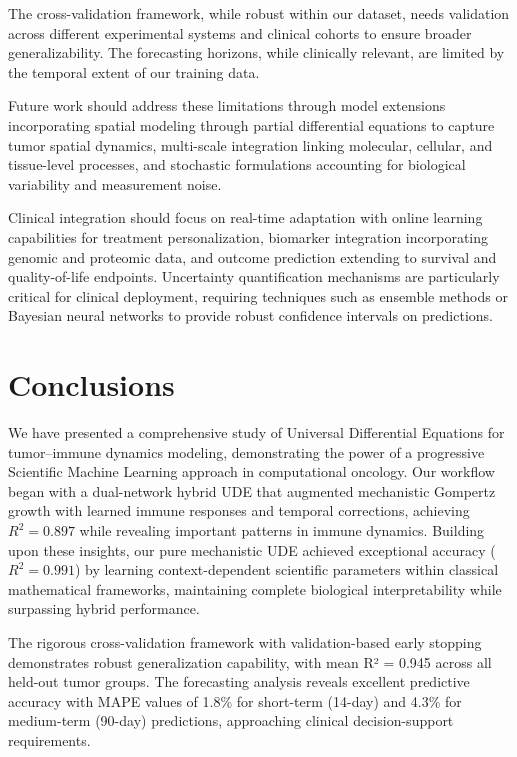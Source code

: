 \documentclass{juliacon}
\begin{document}
The cross-validation framework, while robust within our dataset, needs validation across different experimental systems and clinical cohorts to ensure broader generalizability. The forecasting horizons, while clinically relevant, are limited by the temporal extent of our training data.

Future work should address these limitations through model extensions incorporating spatial modeling through partial differential equations to capture tumor spatial dynamics, multi-scale integration linking molecular, cellular, and tissue-level processes, and stochastic formulations accounting for biological variability and measurement noise.

Clinical integration should focus on real-time adaptation with online learning capabilities for treatment personalization, biomarker integration incorporating genomic and proteomic data, and outcome prediction extending to survival and quality-of-life endpoints. Uncertainty quantification mechanisms are particularly critical for clinical deployment, requiring techniques such as ensemble methods or Bayesian neural networks to provide robust confidence intervals on predictions.

\section{Conclusions}

We have presented a comprehensive study of Universal Differential Equations for tumor--immune dynamics modeling, demonstrating the power of a progressive Scientific Machine Learning approach in computational oncology. Our workflow began with a dual-network hybrid UDE that augmented mechanistic Gompertz growth with learned immune responses and temporal corrections, achieving $R^2 = 0.897$ while revealing important patterns in immune dynamics. Building upon these insights, our pure mechanistic UDE achieved exceptional accuracy ($R^2 = 0.991$) by learning context-dependent scientific parameters within classical mathematical frameworks, maintaining complete biological interpretability while surpassing hybrid performance.

The rigorous cross-validation framework with validation-based early stopping demonstrates robust generalization capability, with mean R² = 0.945 across all held-out tumor groups. The forecasting analysis reveals excellent predictive accuracy with MAPE values of 1.8\% for short-term (14-day) and 4.3\% for medium-term (90-day) predictions, approaching clinical decision-support requirements.
\end{document}
